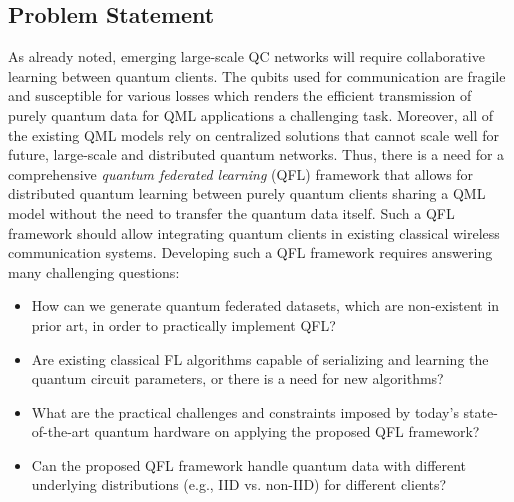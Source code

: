 \documentclass{article}
\begin{document}
\subsection{Problem Statement}
\label{problem_statement}
As already noted, emerging large-scale QC networks will require collaborative learning between quantum clients. The qubits used for communication are fragile and susceptible for various losses which renders the efficient transmission of purely quantum data for QML applications a challenging task. Moreover, all of the existing QML models rely on centralized solutions that cannot scale well for future, large-scale and distributed quantum networks. Thus, there is a need for a comprehensive \emph{quantum federated learning} (QFL) framework that allows for distributed quantum learning between purely quantum clients sharing a QML model without the need to transfer the quantum data itself. Such a QFL framework should allow integrating quantum clients in existing classical wireless communication systems. Developing such a QFL framework requires answering many challenging questions:
\begin{itemize}
    \item How can we generate quantum federated datasets, which are non-existent in prior art, in order to practically implement QFL?
    
    \item Are existing classical FL algorithms capable of serializing and learning the quantum circuit parameters, or there is a need for new algorithms?
    
    \item What are the practical challenges and constraints imposed by today's state-of-the-art quantum hardware on applying the proposed QFL framework?    
    
    \item Can the proposed QFL framework handle quantum data with different underlying distributions (e.g., IID vs. non-IID) for different clients?

\end{itemize}
\end{document}
